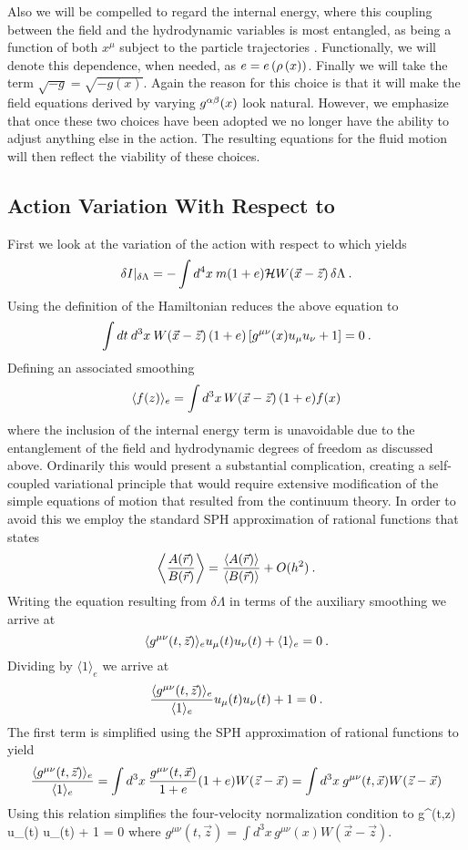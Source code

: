 Also we will be compelled to regard the internal energy, where
this coupling between the field and the hydrodynamic variables is
most entangled, as being a function of both $x^{\mu}$ subject to
the particle trajectories \ptraj{\gm}.  Functionally, we will
denote this dependence, when needed, as $e = e\left( {\rho\left( {x} \right)} \right)$.  Finally
we will take the term $\sqrt{-g} = \sqrt{-g(x)}$.  Again the
reason for this choice is that it will make the field equations
derived by varying $ {g}{{}^{\alpha \beta} } (x)$ look natural.  However, we
emphasize that once these two choices have been adopted we no
longer have the ability to adjust anything else in the action. The
resulting equations for the fluid motion will then reflect the
viability of these choices.

\subsection{Action Variation With Respect to \gL}
First we look at the variation of the action with respect to \gL
which yields
\[
 {\delta {I}\vert}{{}_{\delta {\ensuremath{\Lambda} }} }  = -\int d^4x \: m(1+e) \mathcal{H} W\!\left( {\vec {x} - \vec {z}} \right)
\delta {\ensuremath{\Lambda} } \: .
\]
Using the definition of the Hamiltonian reduces the above equation
to
\[
\int dt \: d^3x \: W\!\left( {\vec {x} - \vec {z}} \right) (1 + e)
\left[ { {g}{{}^{\mu \nu} } (x)  {u}{{}_{\mu} }   {u}{{}_{\nu} }  + 1} \right] = 0 \: .
\]
Defining an associated smoothing
\[
    \langle f(z) \rangle _{e} = \int d^3x \, W\!\left( {\vec {x} - \vec {z}} \right) (1+e) f(x)
\]
where the inclusion of the internal energy term is unavoidable due
to the entanglement of the field and hydrodynamic degrees of
freedom as discussed above.  Ordinarily this would present a
substantial complication, creating a self-coupled variational
principle that would require extensive modification of the simple
equations of motion that resulted from the continuum theory.  In
order to avoid this we employ the standard SPH approximation of
rational functions that states
\[
  \left\langle  \frac{A(\vec r)}{B(\vec r)}  \right\rangle= \frac{ \langle
  A(\vec r) \rangle}{\langle B(\vec r) \rangle} + O(h^2) \: .
\]
Writing the equation resulting from $\delta \Lambda$ in terms of
the auxiliary smoothing we arrive at
\[
  \langle g^{\mu\nu}(t,\vec z) \rangle_e u_{\mu}(t) u_{\nu}(t) +
  \langle 1 \rangle_{e} = 0 \: .
\]
Dividing by $\langle 1 \rangle_e$ we arrive at
\[
  \frac{\langle g^{\mu\nu}(t,\vec z) \rangle_{e}}{\langle 1
  \rangle_{e}}u_{\mu}(t) u_{\nu}(t) + 1 = 0 \: .
\]
The first term is simplified using the SPH approximation of
rational functions to yield
\[
\frac{\langle g^{\mu\nu}(t,\vec z) \rangle_{e}}{\langle 1
  \rangle_{e}}  =    \int d^3x \: \frac{g^{\mu\nu}(t,\vec x)}{1+e} (1+e)
  W(\vec z - \vec x) =  \int d^3x \: g^{\mu\nu}(t,\vec x) W(\vec z
  - \vec x)
\]
Using this relation simplifies the four-velocity normalization
condition to \be\label{eq:norm_cond} g^{\mu\nu}(t,\vec z)
u_{\mu}(t) u_{\nu}(t) + 1 = 0 \ee where $g^{\mu\nu}(t,\vec z) =
\int d^3x \, g^{\mu\nu}(x) W(\vec x - \vec z)$.

